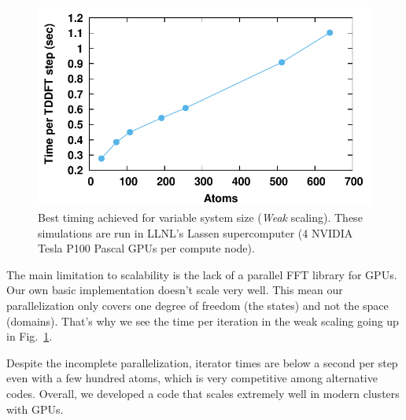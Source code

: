 \begin{figure}[h]
	\centering
	\includegraphics[width=1.0\linewidth]{figures/scaling/weak}
	\caption{
		Best timing achieved for variable system size (\emph{Weak} scaling).
		These simulations are run in LLNL's Lassen supercomputer (4 NVIDIA Tesla P100 Pascal GPUs per compute node).
	}
	\label{fig:scaling_weak}
\end{figure}

The main limitation to scalability is the lack of a parallel FFT library for GPUs. 
Our own basic implementation doesn't scale very well. 
This mean our parallelization only covers one degree of freedom (the states) and not the space (domains). 
That's why we see the time per iteration in the weak scaling going up in Fig.~\ref{fig:scaling_weak}.

Despite the incomplete parallelization, iterator times are below a second per step even with a few hundred atoms, which is very competitive among alternative codes.
Overall, we developed a code that scales extremely well in modern clusters with GPUs.

